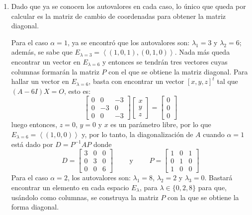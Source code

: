 \begin{solucion}
\begin{enumerate}[$a$)]
  \item Dado que ya se conocen los autovalores en cada caso, lo \'unico que queda por calcular es la matriz de cambio de coordenadas para obtener la matriz diagonal.
  \par 
  Para el caso $\alpha = 1$, ya se encontr\'o que los autovalores son: $\lambda_1 = 3$ y $\lambda_2 = 6$; adem\'as, se sabe que $E_{\lambda=3} = \left< (1,0,1), (0,1,0) \right>$. Nada m\'as queda encontrar un vector en $E_{\lambda=6}$ y entonces se tendr\'an tres vectores cuyas columnas formar\'an la matriz $P$ con el que se obtiene la matriz diagonal. 
  Para hallar un vector en $E_{\lambda=6}$, basta con encontrar un vector $[x,y,z]^t$ tal que $(A-6I)X = O$, esto es:
  \begin{equation*}
   \begin{bmatrix}
    0 &  0 & -3 \\ 
    0 & -3 &  0 \\
    0 &  0 & -3 
   \end{bmatrix}
   \begin{bmatrix}
    x \\ y \\ z
   \end{bmatrix}
   =
   \begin{bmatrix}
    0 \\ 0 \\ 0
   \end{bmatrix}
  \end{equation*}
  luego entonces, $z = 0$, $y= 0$ y $x$ es un par\'ametro libre, por lo que $E_{\lambda=6} = \left< (1,0,0)\right>$ y, por lo tanto, la diagonalizaci\'on de $A$ cuando $\alpha=1$ est\'a dado por $D = P^{-1}AP$ donde
  \begin{equation*}
   D =
   \begin{bmatrix}
    3 & 0 & 0 \\
    0 & 3 & 0 \\
    0 & 0 & 6
   \end{bmatrix}
   \qquad \text{ y } \qquad 
   P = 
   \begin{bmatrix}
    1 & 0 & 1 \\
    0 & 1 & 0 \\
    1 & 0 & 0
   \end{bmatrix}
  \end{equation*}
  Para el caso $\alpha = 2$, los autovalores son: $\lambda_1 = 8$, $\lambda_2 = 2$ y $\lambda_3 = 0$.
  Bastar\'a encontrar un elemento en cada espacio $E_{\lambda}$, para $\lambda \in \{0,2,8\}$ para que, us\'andolo como columnas, se construya la matriz $P$ con la que se obtiene la forma diagonal. 

\end{enumerate}
\end{solucion}
